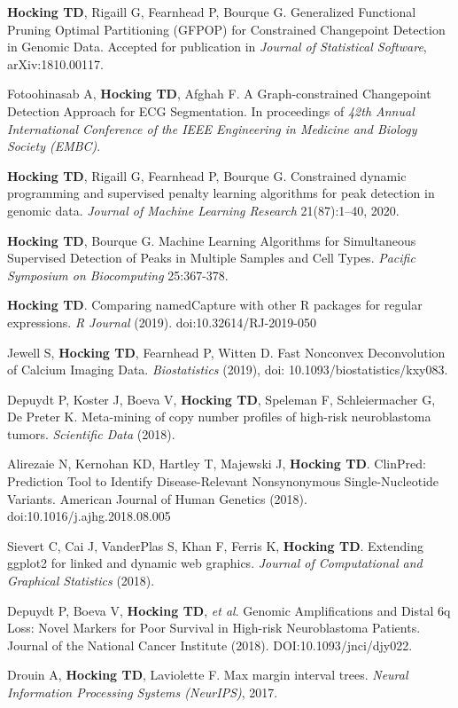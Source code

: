 \documentclass[margin,line]{res}
\begin{document}
\begin{resume}
{\bf Hocking TD}, Rigaill G, Fearnhead P, Bourque G. Generalized
Functional Pruning Optimal Partitioning (GFPOP) for Constrained
Changepoint Detection in Genomic Data. Accepted for publication in
{\it Journal of Statistical Software}, arXiv:1810.00117.

Fotoohinasab A, {\bf Hocking TD}, Afghah F. A Graph-constrained
Changepoint Detection Approach for ECG Segmentation. In proceedings of
{\it 42th Annual International Conference of the IEEE Engineering in
  Medicine and Biology Society (EMBC)}.

{\bf Hocking TD}, Rigaill G, Fearnhead P, Bourque G. Constrained
dynamic programming and supervised penalty learning algorithms for
peak detection in genomic data. {\it Journal of Machine Learning
  Research} 21(87):1--40, 2020.

{\bf Hocking TD}, Bourque G. Machine Learning Algorithms for
Simultaneous Supervised Detection of Peaks in Multiple Samples and
Cell Types. {\it Pacific Symposium on Biocomputing} 25:367-378.

{\bf Hocking TD}. Comparing namedCapture with other R packages for
regular expressions. {\it R Journal} (2019). doi:10.32614/RJ-2019-050

Jewell S, {\bf Hocking TD}, Fearnhead P, Witten D. Fast Nonconvex
Deconvolution of Calcium Imaging Data. {\it Biostatistics} (2019), doi:
10.1093/biostatistics/kxy083.

Depuydt P, Koster J, Boeva V, {\bf Hocking TD}, Speleman F,
Schleiermacher G, De Preter K. Meta-mining of copy number profiles of
high-risk neuroblastoma tumors. {\it Scientific Data} (2018).

Alirezaie N, Kernohan KD, Hartley T, Majewski J, {\bf Hocking
  TD}. ClinPred: Prediction Tool to Identify Disease-Relevant
Nonsynonymous Single-Nucleotide Variants. American Journal of Human
Genetics (2018). doi:10.1016/j.ajhg.2018.08.005

Sievert C, Cai J, VanderPlas S, Khan F, Ferris K, {\bf Hocking
  TD}. Extending ggplot2 for linked and dynamic web graphics. {\it
  Journal of Computational and Graphical Statistics} (2018).

Depuydt P, Boeva V, {\bf Hocking TD}, {\it et al}. Genomic Amplifications and Distal 6q
  Loss: Novel Markers for Poor Survival in High-risk Neuroblastoma
  Patients. Journal of the National Cancer
  Institute (2018). DOI:10.1093/jnci/djy022.

Drouin A, {\bf Hocking TD}, Laviolette F. Max margin interval
trees. {\it Neural Information Processing Systems (NeurIPS)}, 2017.


\end{resume}
\end{document}
